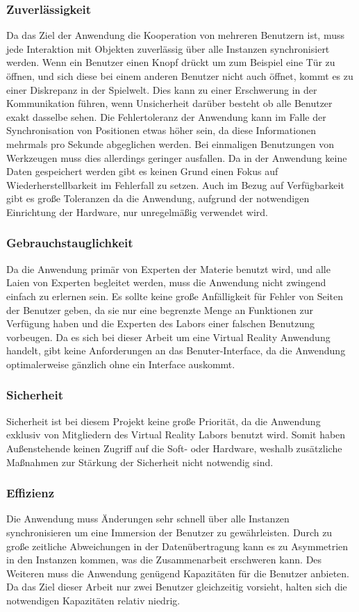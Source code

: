\subsubsection*{Zuverlässigkeit}
Da das Ziel der Anwendung die Kooperation von mehreren Benutzern ist, muss jede Interaktion mit Objekten zuverlässig über alle Instanzen synchronisiert werden. Wenn ein Benutzer einen Knopf drückt um zum Beispiel eine Tür zu öffnen, und sich diese bei einem anderen Benutzer nicht auch öffnet, kommt es zu einer Diskrepanz in der Spielwelt. Dies kann zu einer Erschwerung in der Kommunikation führen, wenn Unsicherheit darüber besteht ob alle Benutzer exakt dasselbe sehen. Die Fehlertoleranz der Anwendung kann im Falle der Synchronisation von Positionen etwas höher sein, da diese Informationen mehrmals pro Sekunde abgeglichen werden. Bei einmaligen Benutzungen von Werkzeugen muss dies allerdings geringer ausfallen.
Da in der Anwendung keine Daten gespeichert werden gibt es keinen Grund einen Fokus auf Wiederherstellbarkeit im Fehlerfall zu setzen. Auch im Bezug auf Verfügbarkeit gibt es große Toleranzen da die Anwendung, aufgrund der notwendigen Einrichtung der Hardware, nur unregelmäßig verwendet wird.

\subsubsection*{Gebrauchstauglichkeit}
Da die Anwendung primär von Experten der Materie benutzt wird, und alle Laien von Experten begleitet werden, muss die Anwendung nicht zwingend einfach zu erlernen sein. Es sollte keine große Anfälligkeit für Fehler von Seiten der Benutzer geben, da sie nur eine begrenzte Menge an Funktionen zur Verfügung haben und die Experten des Labors einer falschen Benutzung vorbeugen. Da es sich bei dieser Arbeit um eine Virtual Reality Anwendung handelt, gibt keine Anforderungen an das Benuter-Interface, da die Anwendung optimalerweise gänzlich ohne ein Interface auskommt. 

\subsubsection*{Sicherheit}
Sicherheit ist bei diesem Projekt keine große Priorität, da die Anwendung exklusiv von Mitgliedern des Virtual Reality Labors benutzt wird. Somit haben Außenstehende keinen Zugriff auf die Soft- oder Hardware, weshalb zusätzliche Maßnahmen zur Stärkung der Sicherheit nicht notwendig sind.

\subsubsection*{Effizienz}
Die Anwendung muss Änderungen sehr schnell über alle Instanzen synchronisieren um eine Immersion der Benutzer zu gewährleisten. Durch zu große zeitliche Abweichungen in der Datenübertragung kann es zu Asymmetrien in den Instanzen kommen, was die Zusammenarbeit erschweren kann. Des Weiteren muss die Anwendung genügend Kapazitäten für die Benutzer anbieten. Da das Ziel dieser Arbeit nur zwei Benutzer gleichzeitig vorsieht, halten sich die notwendigen Kapazitäten relativ niedrig. 

